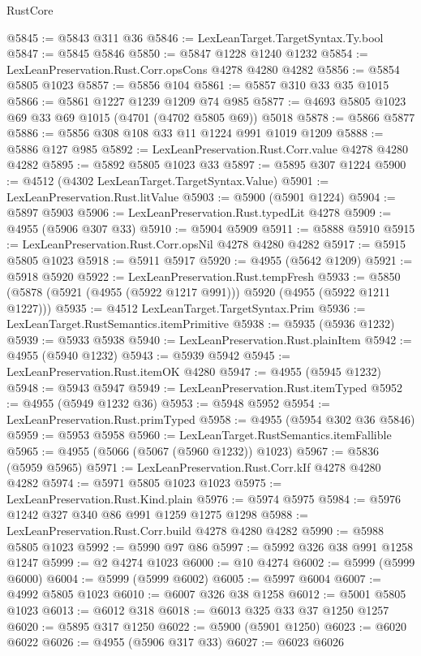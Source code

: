 \begin{lexlean}{RustCore}
\begin{coremodule}
@5845 := @5843 @311 @36
@5846 := LexLeanTarget.TargetSyntax.Ty.bool
@5847 := @5845 @5846
@5850 := @5847 @1228 @1240 @1232
@5854 := LexLeanPreservation.Rust.Corr.opsCons @4278 @4280 @4282
@5856 := @5854 @5805 @1023
@5857 := @5856 @104
@5861 := @5857 @310 @33 @35 @1015
@5866 := @5861 @1227 @1239 @1209 @74 @985
@5877 := @4693 @5805 @1023 @69 @33 @69 @1015 (@4701 (@4702 @5805 @69)) @5018
@5878 := @5866 @5877
@5886 := @5856 @308 @108 @33 @11 @1224 @991 @1019 @1209
@5888 := @5886 @127 @985
@5892 := LexLeanPreservation.Rust.Corr.value @4278 @4280 @4282
@5895 := @5892 @5805 @1023 @33
@5897 := @5895 @307 @1224
@5900 := @4512 (@4302 LexLeanTarget.TargetSyntax.Value)
@5901 := LexLeanPreservation.Rust.litValue
@5903 := @5900 (@5901 @1224)
@5904 := @5897 @5903
@5906 := LexLeanPreservation.Rust.typedLit @4278
@5909 := @4955 (@5906 @307 @33)
@5910 := @5904 @5909
@5911 := @5888 @5910
@5915 := LexLeanPreservation.Rust.Corr.opsNil @4278 @4280 @4282
@5917 := @5915 @5805 @1023
@5918 := @5911 @5917
@5920 := @4955 (@5642 @1209)
@5921 := @5918 @5920
@5922 := LexLeanPreservation.Rust.tempFresh
@5933 := @5850 (@5878 (@5921 (@4955 (@5922 @1217 @991))) @5920 (@4955 (@5922 @1211 @1227)))
@5935 := @4512 LexLeanTarget.TargetSyntax.Prim
@5936 := LexLeanTarget.RustSemantics.itemPrimitive
@5938 := @5935 (@5936 @1232)
@5939 := @5933 @5938
@5940 := LexLeanPreservation.Rust.plainItem
@5942 := @4955 (@5940 @1232)
@5943 := @5939 @5942
@5945 := LexLeanPreservation.Rust.itemOK @4280
@5947 := @4955 (@5945 @1232)
@5948 := @5943 @5947
@5949 := LexLeanPreservation.Rust.itemTyped
@5952 := @4955 (@5949 @1232 @36)
@5953 := @5948 @5952
@5954 := LexLeanPreservation.Rust.primTyped
@5958 := @4955 (@5954 @302 @36 @5846)
@5959 := @5953 @5958
@5960 := LexLeanTarget.RustSemantics.itemFallible
@5965 := @4955 (@5066 (@5067 (@5960 @1232)) @1023)
@5967 := @5836 (@5959 @5965)
@5971 := LexLeanPreservation.Rust.Corr.kIf @4278 @4280 @4282
@5974 := @5971 @5805 @1023 @1023
@5975 := LexLeanPreservation.Rust.Kind.plain
@5976 := @5974 @5975
@5984 := @5976 @1242 @327 @340 @86 @991 @1259 @1275 @1298
@5988 := LexLeanPreservation.Rust.Corr.build @4278 @4280 @4282
@5990 := @5988 @5805 @1023
@5992 := @5990 @97 @86
@5997 := @5992 @326 @38 @991 @1258 @1247
@5999 := @2 @4274 @1023
@6000 := @10 @4274
@6002 := @5999 (@5999 @6000)
@6004 := @5999 (@5999 @6002)
@6005 := @5997 @6004
@6007 := @4992 @5805 @1023
@6010 := @6007 @326 @38 @1258
@6012 := @5001 @5805 @1023
@6013 := @6012 @318
@6018 := @6013 @325 @33 @37 @1250 @1257
@6020 := @5895 @317 @1250
@6022 := @5900 (@5901 @1250)
@6023 := @6020 @6022
@6026 := @4955 (@5906 @317 @33)
@6027 := @6023 @6026

\end{coremodule}
\end{lexlean}
